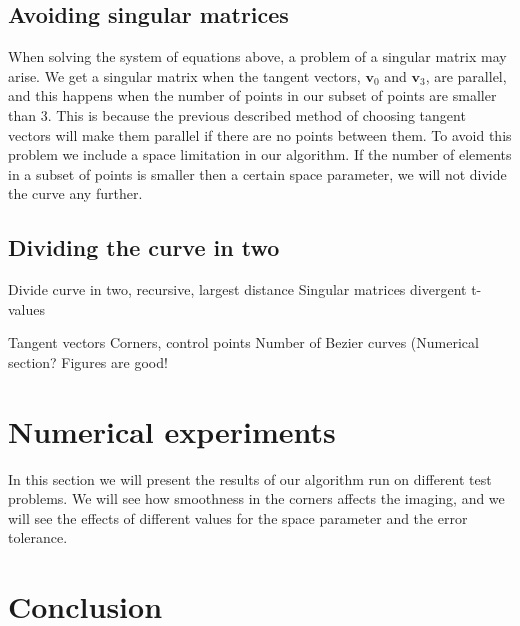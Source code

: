 \documentclass[10pt]{article}
\begin{document}
\subsection*{Avoiding singular matrices}
When solving the system of equations above, a problem of a singular matrix may arise. We get a singular matrix when the tangent vectors, $\mathbf{v}_0$ and $\mathbf{v}_3$, are parallel, and this happens when the number of points in our subset of points are smaller than 3. This is because the previous described method of choosing tangent vectors will make them parallel if there are no points between them. To avoid this problem we include a space limitation in our algorithm. If the number of elements in a subset of points is smaller then a certain space parameter, we will not divide the curve any further.


\subsection*{Dividing the curve in two}



Divide curve in two, recursive, largest distance
Singular matrices
divergent t-values


Tangent vectors
Corners, control points
Number of Bezier curves (Numerical section?
Figures are good!


\section{Numerical experiments}

In this section we will present the results of our algorithm run on different test problems. We will see how smoothness in the corners affects the imaging, and we will see the effects of different values for the space parameter and the error tolerance.






\section{Conclusion}
\cite{Plass:1983}


\end{document}

